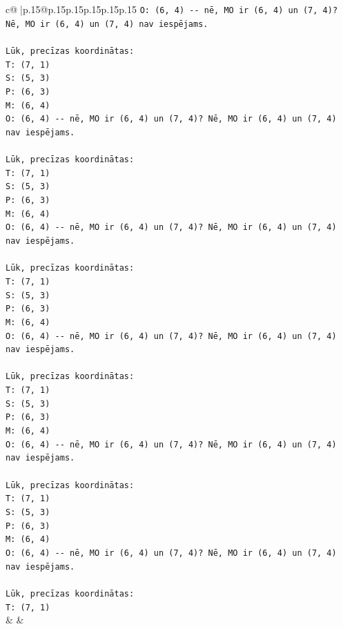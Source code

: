 \documentclass{article}
\begin{document}
{\begin{supertabular}{c@{$\;$}|p{.15\linewidth}@{}p{.15\linewidth}p{.15\linewidth}p{.15\linewidth}p{.15\linewidth}p{.15\linewidth}}
{{{\texttt{O: (6, 4) {-}{-} nē, MO ir (6, 4) un (7, 4)? Nē, MO ir (6, 4) un (7, 4) nav iespējams.} \\
\\ 
\texttt{Lūk, precīzas koordinātas:} \\
\texttt{T: (7, 1)} \\
\texttt{S: (5, 3)} \\
\texttt{P: (6, 3)} \\
\texttt{M: (6, 4)} \\
\texttt{O: (6, 4) {-}{-} nē, MO ir (6, 4) un (7, 4)? Nē, MO ir (6, 4) un (7, 4) nav iespējams.} \\
\\ 
\texttt{Lūk, precīzas koordinātas:} \\
\texttt{T: (7, 1)} \\
\texttt{S: (5, 3)} \\
\texttt{P: (6, 3)} \\
\texttt{M: (6, 4)} \\
\texttt{O: (6, 4) {-}{-} nē, MO ir (6, 4) un (7, 4)? Nē, MO ir (6, 4) un (7, 4) nav iespējams.} \\
\\ 
\texttt{Lūk, precīzas koordinātas:} \\
\texttt{T: (7, 1)} \\
\texttt{S: (5, 3)} \\
\texttt{P: (6, 3)} \\
\texttt{M: (6, 4)} \\
\texttt{O: (6, 4) {-}{-} nē, MO ir (6, 4) un (7, 4)? Nē, MO ir (6, 4) un (7, 4) nav iespējams.} \\
\\ 
\texttt{Lūk, precīzas koordinātas:} \\
\texttt{T: (7, 1)} \\
\texttt{S: (5, 3)} \\
\texttt{P: (6, 3)} \\
\texttt{M: (6, 4)} \\
\texttt{O: (6, 4) {-}{-} nē, MO ir (6, 4) un (7, 4)? Nē, MO ir (6, 4) un (7, 4) nav iespējams.} \\
\\ 
\texttt{Lūk, precīzas koordinātas:} \\
\texttt{T: (7, 1)} \\
\texttt{S: (5, 3)} \\
\texttt{P: (6, 3)} \\
\texttt{M: (6, 4)} \\
\texttt{O: (6, 4) {-}{-} nē, MO ir (6, 4) un (7, 4)? Nē, MO ir (6, 4) un (7, 4) nav iespējams.} \\
\\ 
\texttt{Lūk, precīzas koordinātas:} \\
\texttt{T: (7, 1)} \\
            }
        }
    }
    & & \\ \\


\end{supertabular}}
\end{document}
